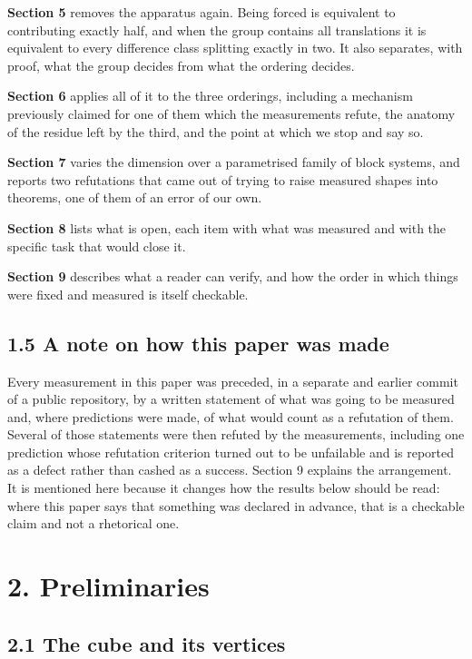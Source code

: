 \documentclass[11pt,a4paper]{article}
\begin{document}
\textbf{Section 5} removes the apparatus again. Being forced is equivalent to contributing exactly half, and when the group contains all translations it is equivalent to every difference class splitting exactly in two. It also separates, with proof, what the group decides from what the ordering decides.

\textbf{Section 6} applies all of it to the three orderings, including a mechanism previously claimed for one of them which the measurements refute, the anatomy of the residue left by the third, and the point at which we stop and say so.

\textbf{Section 7} varies the dimension over a parametrised family of block systems, and reports two refutations that came out of trying to raise measured shapes into theorems, one of them of an error of our own.

\textbf{Section 8} lists what is open, each item with what was measured and with the specific task that would close it.

\textbf{Section 9} describes what a reader can verify, and how the order in which things were fixed and measured is itself checkable.

\subsection*{1.5 A note on how this paper was made}

Every measurement in this paper was preceded, in a separate and earlier commit of a public repository, by a written statement of what was going to be measured and, where predictions were made, of what would count as a refutation of them. Several of those statements were then refuted by the measurements, including one prediction whose refutation criterion turned out to be unfailable and is reported as a defect rather than cashed as a success. Section 9 explains the arrangement. It is mentioned here because it changes how the results below should be read: where this paper says that something was declared in advance, that is a checkable claim and not a rhetorical one.

\section*{2. Preliminaries}

\subsection*{2.1 The cube and its vertices}
\end{document}
